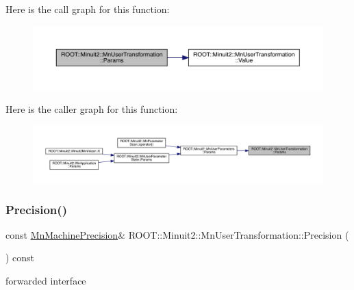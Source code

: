 Here is the call graph for this function\+:
\nopagebreak
\begin{figure}[H]
\begin{center}
\leavevmode
\includegraphics[width=350pt]{d9/d98/classROOT_1_1Minuit2_1_1MnUserTransformation_a85477022b0cfb39ccfe69a46cdaffe73_cgraph}
\end{center}
\end{figure}
Here is the caller graph for this function\+:
\nopagebreak
\begin{figure}[H]
\begin{center}
\leavevmode
\includegraphics[width=350pt]{d9/d98/classROOT_1_1Minuit2_1_1MnUserTransformation_a85477022b0cfb39ccfe69a46cdaffe73_icgraph}
\end{center}
\end{figure}
\mbox{\label{classROOT_1_1Minuit2_1_1MnUserTransformation_af9d893a428a4f4d94dfef1bdd3e9936e}} 
\subsubsection{\texorpdfstring{Precision()}{Precision()}\hspace{0.1cm}{\footnotesize\ttfamily [1/3]}}
{\footnotesize\ttfamily const \mbox{\hyperlink{classROOT_1_1Minuit2_1_1MnMachinePrecision}{Mn\+Machine\+Precision}}\& R\+O\+O\+T\+::\+Minuit2\+::\+Mn\+User\+Transformation\+::\+Precision (\begin{DoxyParamCaption}{ }\end{DoxyParamCaption}) const\hspace{0.3cm}{\ttfamily [inline]}}

forwarded interface \mbox{\label{classROOT_1_1Minuit2_1_1MnUserTransformation_af9d893a428a4f4d94dfef1bdd3e9936e}} 
